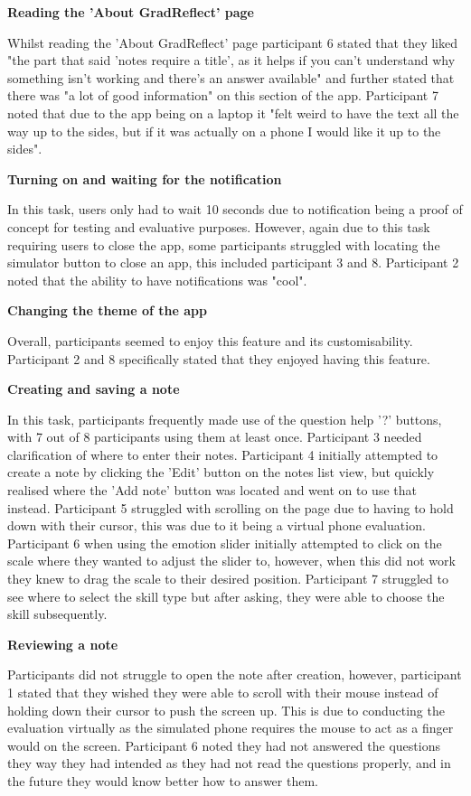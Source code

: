 \documentclass{l4proj}
\begin{document}
\textbf{Reading the 'About GradReflect' page}

Whilst reading the 'About GradReflect' page participant 6 stated that they liked "the part that said 'notes require a title', as it helps if you can't understand why something isn't working and there's an answer available" and further stated that there was "a lot of good information" on this section of the app. Participant 7 noted that due to the app being on a laptop it "felt weird to have the text all the way up to the sides, but if it was actually on a phone I would like it up to the sides".

\textbf{Turning on and waiting for the notification}

In this task, users only had to wait 10 seconds due to notification being a proof of concept for testing and evaluative purposes. However, again due to this task requiring users to close the app, some participants struggled with locating the simulator button to close an app, this included participant 3 and 8. Participant 2 noted that the ability to have notifications was "cool".

\textbf{Changing the theme of the app}

Overall, participants seemed to enjoy this feature and its customisability. Participant 2 and 8 specifically stated that they enjoyed having this feature.

\textbf{Creating and saving a note}

In this task, participants frequently made use of the question help '?' buttons, with 7 out of 8 participants using them at least once. Participant 3 needed clarification of where to enter their notes. Participant 4 initially attempted to create a note by clicking the 'Edit' button on the notes list view, but quickly realised where the 'Add note' button was located and went on to use that instead. Participant 5 struggled with scrolling on the page due to having to hold down with their cursor, this was due to it being a virtual phone evaluation. Participant 6 when using the emotion slider initially attempted to click on the scale where they wanted to adjust the slider to, however, when this did not work they knew to drag the scale to their desired position. Participant 7 struggled to see where to select the skill type but after asking, they were able to choose the skill subsequently.

\textbf{Reviewing a note}

Participants did not struggle to open the note after creation, however, participant 1 stated that they wished they were able to scroll with their mouse instead of holding down their cursor to push the screen up. This is due to conducting the evaluation virtually as the simulated phone requires the mouse to act as a finger would on the screen. Participant 6 noted they had not answered the questions they way they had intended as they had not read the questions properly, and in the future they would know better how to answer them.
\end{document}
